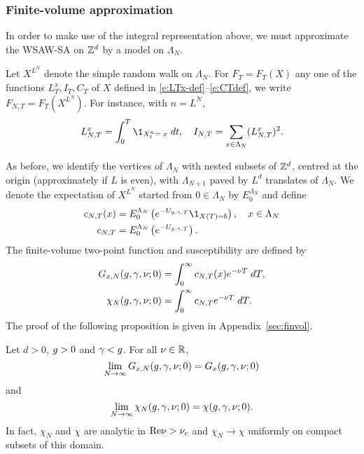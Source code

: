 \subsubsection{Finite-volume approximation}

In order to make use of the integral representation above, we must approximate the
WSAW-SA on ${ {{\mathbb Z}}^d }$ by a model on $\Lambda_N$.

Let $X^{L^N}$ denote the simple random walk on $\Lambda_N$.
For $F_T = F_T(X)$ any one of the functions $L_T^x,I_T,C_T$
of $X$ defined in \eqref{e:LTx-def}--\eqref{e:CTdef},
we write $F_{N,T} = F_T(X^{L^N})$. For instance, with $n=L^N$,
\begin{equation}
    L^x_{N,T} = \int_0^T \1_{X^{n}_t=\;x} \; dt,
    \quad I_{N,T} = \sum_{x \in \Lambda_N}(L_{N,T}^x)^2 .
\end{equation}

As before, we identify the vertices of $\Lambda_N$ with nested subsets of ${ {{\mathbb Z}}^d }$,
centred at the origin (approximately if $L$ is even),
with $\Lambda_{N+1}$ paved by $L^d$ translates of $\Lambda_N$.
We denote the expectation of $X^{L^N}$ started from $0 \in \Lambda_N$ by $E^{\Lambda_N}_0$
and define
\begin{align}
\label{e:cN}
c_{N,T}(x)
    &= E^{\Lambda_N}_0 \left( e^{-U_{\gcc,\gamma,T}} \1_{X(T)=b} \right),
    \quad x \in \Lambda_N \\
c_{N,T}
    &= E^{\Lambda_N}_0 \left( e^{-U_{\gcc,\gamma,T}} \right).
\end{align}
The finite-volume two-point function and susceptibility
are defined by
\begin{align}
G_{x,N}(g,\gamma,\nu; 0)
    &=
\int_0^\infty c_{N,T}(x) e^{-\nu T} \; dT, \\
\label{e:chiNdef-pre}
\chi_N(g, \gamma, \nu; 0)
    &=
\int_0^\infty c_{N,T} e^{-\nu T} \; dT.
\end{align}
The proof of the following proposition is given in Appendix~\ref{sec:finvol}.

\begin{prop}
\label{prop:finvol}
Let $d >0$, $g >0$ and $\gamma < g$. For all $\nu \in {\mathbb R}$,
\begin{equation}
\label{e:Givlc}
\lim_{N \rightarrow \infty}
G_{x,N}(g,\gamma,\nu; 0)
=
G_x(g,\gamma,\nu; 0)
\end{equation}
and
\begin{equation}
\label{e:chilim-pre}
\lim_{N\rightarrow\infty}\chi_N(g,\gamma,\nu; 0) =   \chi(g,\gamma,\nu; 0).
\end{equation}
In fact, $\chi_N$ and $\chi$ are analytic in ${\rm Re} \nu > \nu_c$ and
$\chi_N \to \chi$ uniformly on compact subsets of this domain.
\end{prop}
